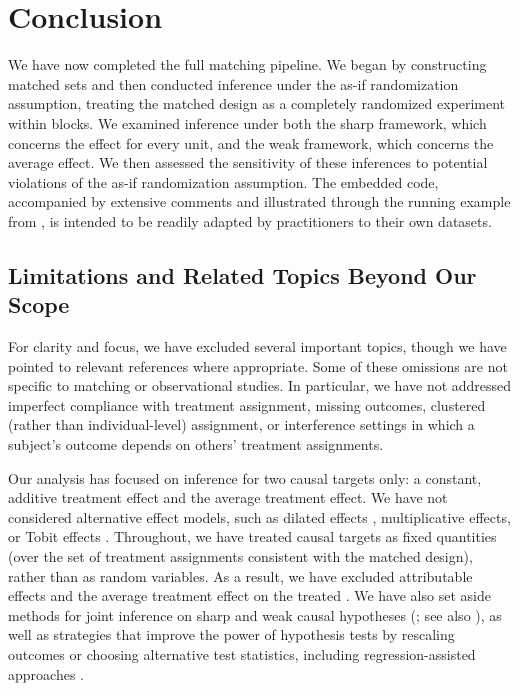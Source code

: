\documentclass[
  12pt,
  leqno]{article}
\begin{document}
\section{Conclusion}\label{conclusion}

We have now completed the full matching pipeline. We began by
constructing matched sets and then conducted inference under the as-if
randomization assumption, treating the matched design as a completely
randomized experiment within blocks. We examined inference under both
the sharp framework, which concerns the effect for every unit, and the
weak framework, which concerns the average effect. We then assessed the
sensitivity of these inferences to potential violations of the as-if
randomization assumption. The embedded code, accompanied by extensive
comments and illustrated through the running example from
\citet{gilligansergenti2008}, is intended to be readily adapted by
practitioners to their own datasets.

\subsection{Limitations and Related Topics Beyond Our
Scope}\label{limitations-and-related-topics-beyond-our-scope}

For clarity and focus, we have excluded several important topics, though
we have pointed to relevant references where appropriate. Some of these
omissions are not specific to matching or observational studies. In
particular, we have not addressed imperfect compliance with treatment
assignment, missing outcomes, clustered (rather than individual-level)
assignment, or interference settings in which a subject's outcome
depends on others' treatment assignments.

Our analysis has focused on inference for two causal targets only: a
constant, additive treatment effect and the average treatment effect. We
have not considered alternative effect models, such as dilated effects
\citep{rosenbaum1999}, multiplicative effects, or Tobit effects
\citep[pp.~46--48]{rosenbaum2010}. Throughout, we have treated causal
targets as fixed quantities (over the set of treatment assignments
consistent with the matched design), rather than as random variables. As
a result, we have excluded attributable effects
\citep{rosenbaum2001, rosenbaum2003, hansenbowers2009} and the average
treatment effect on the treated \citep{sekhonshem-tov2021}. We have also
set aside methods for joint inference on sharp and weak causal
hypotheses (\citealp{wuding2021, cohenfogarty2022}; see also
\citealp{ding2017}), as well as strategies that improve the power of
hypothesis tests by rescaling outcomes or choosing alternative test
statistics, including regression-assisted approaches
\citep{lin2013, cohenfogarty2023, guobasse2023}.
\end{document}
